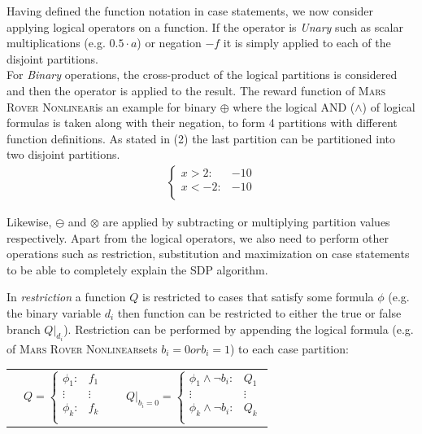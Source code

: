 \documentclass[letterpaper]{article}
\newcommand{\MarsRoverNL}{\textsc{Mars Rover Nonlinear}}
\begin{document}
Having defined the function notation in case statements, we now consider applying logical operators on a function. 
If the operator is \textit{Unary} such as scalar multiplications (e.g. $0.5 \cdot a$) or negation $-f$ it is simply applied to each of the disjoint partitions. 
\\ For \textit{Binary} operations, the cross-product of the logical partitions is considered and then the operator is applied to the result. The reward function of \MarsRoverNL is an 
example for binary $\oplus$ where the logical AND ($\wedge$) of logical formulas is taken along with their negation, to form 4 partitions with different function definitions. As stated in (2) the last partition can be partitioned into two disjoint partitions.
\begin{align*}
\begin{cases}
x > 2 : &  -10 \\
x < -2 : &  -10 \\
\end{cases}
\end{align*}

Likewise, $\ominus$ and $\otimes$ are applied by subtracting or multiplying partition values respectively.  
Apart from the logical operators, we also need to perform other operations such as restriction, substitution and maximization on case statements to be able to completely explain the SDP algorithm. 

In \emph{restriction} a function $Q$ is restricted to cases that satisfy some formula $\phi$ (e.g. the binary variable $d_i$ then function can be restricted to either the true or false branch $Q|_{d_i}$). Restriction can be performed by appending  the logical formula (e.g. of \MarsRoverNL sets $b_i=0 or b_i=1$) to each case partition:
{\footnotesize
\begin{center}
\begin{tabular}{r c c l}
&
\hspace{-6mm} 
  $Q = \begin{cases}
    \phi_1: & f_1 \\ 
   \vdots&\vdots\\ 
    \phi_k: & f_k \\ 
  \end{cases}$
&

&
\hspace{-2mm}
  $Q|_{b_i = 0} = \begin{cases}
    \phi_1 \land \neg b_i : & Q_1 \\ 
   \vdots&\vdots \\ 
    \phi_k \land \neg b_i : & Q_k \\ 
  \end{cases}$
\end{tabular}
\end{center}
}
\end{document}
